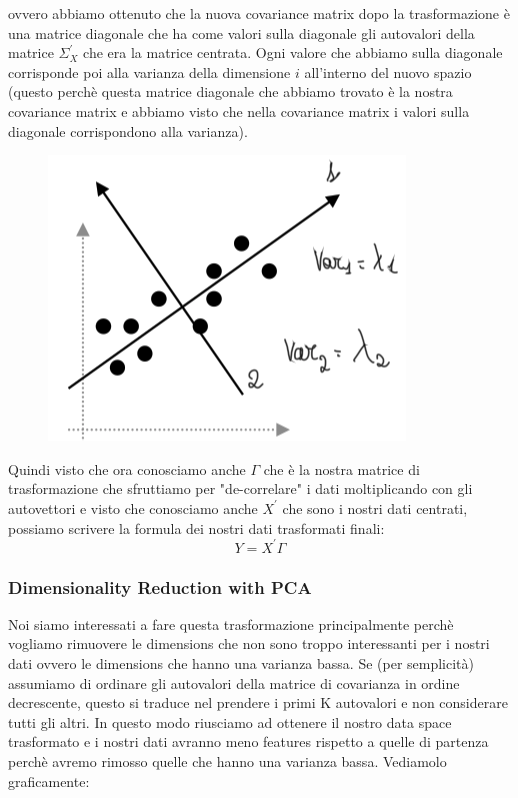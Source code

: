 \documentclass[14pt]{extreport}
\begin{document}
ovvero abbiamo ottenuto che la nuova covariance matrix dopo la trasformazione è una matrice diagonale che ha come valori sulla diagonale gli
autovalori della matrice $\Sigma_X^{'}$ che era la matrice centrata. Ogni valore che abbiamo sulla diagonale corrisponde poi alla varianza della
dimensione $i$ all'interno del nuovo spazio (questo perchè questa matrice diagonale che abbiamo trovato è la nostra covariance matrix e abbiamo visto
che nella covariance matrix i valori sulla diagonale corrispondono alla varianza).


\begin{figure}[H]
	\centering
	\includegraphics[width=0.7\linewidth]{449.jpeg}
\end{figure}

Quindi visto che ora conosciamo anche $\Gamma$ che è la nostra matrice di trasformazione che sfruttiamo per "de-correlare" i dati moltiplicando con
gli autovettori e visto che conosciamo anche $X^{'}$ che sono i nostri dati centrati, possiamo scrivere la formula dei nostri dati trasformati finali:
$$Y = X^{'}\Gamma$$


\subsubsection{Dimensionality Reduction with PCA}

Noi siamo interessati a fare questa trasformazione principalmente perchè vogliamo rimuovere le dimensions che non sono troppo interessanti per i
nostri dati ovvero le dimensions che hanno una varianza bassa. Se (per semplicità) assumiamo di ordinare gli autovalori della matrice di covarianza in
ordine decrescente, questo si traduce nel prendere i primi K autovalori e non considerare tutti gli altri. In questo modo riusciamo ad ottenere il
nostro data space trasformato e i nostri dati avranno meno features rispetto a quelle di partenza perchè avremo rimosso quelle che hanno una varianza
bassa. Vediamolo graficamente:
\end{document}
